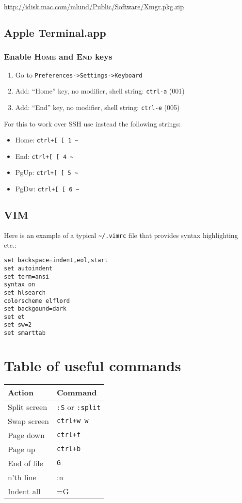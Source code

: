 \documentclass[a4paper,10pt]{article}
\begin{document}
\url{http://idisk.mac.com/mlund/Public/Software/Xmgr.pkg.zip}\\

\subsection{Apple Terminal.app}
\subsubsection{Enable \textsc{Home} and \textsc{End} keys}
\begin{enumerate}
\item Go to \verb"Preferences->Settings->Keyboard"
\item Add: ``Home'' key, no modifier, shell string: \verb"ctrl-a" (001)
\item Add: ``End'' key, no modifier, shell string: \verb"ctrl-e" (005)
\end{enumerate}
For this to work over SSH use instead the following strings:
\begin{itemize}
\item Home: \verb"ctrl+[ [ 1 ~"
\item End: \verb"ctrl+[ [ 4 ~"
\item PgUp: \verb"ctrl+[ [ 5 ~"
\item PgDw: \verb"ctrl+[ [ 6 ~"
\end{itemize}

\subsection{VIM}
Here is an example of a typical \verb"~/.vimrc" file that provides syntax highlighting etc.:
\begin{footnotesize}\begin{verbatim}
set backspace=indent,eol,start
set autoindent
set term=ansi
syntax on
set hlsearch
colorscheme elflord
set backgound=dark
set et
set sw=2
set smarttab
\end{verbatim}\end{footnotesize}

\section{Table of useful commands}
\begin{table}[h]
\center\begin{small}
\begin{tabular}{ll}\hline\hline
Action         & Command \\\hline
Split screen   & \verb":S" or \verb":split"\\
Swap screen    & \verb"ctrl+w w"\\
Page down      & \verb"ctrl+f"\\
Page up        & \verb"ctrl+b"\\
End of file    & \verb"G"\\
n'th line      & :n\\
Indent all     & =G\\
\end{tabular}\end{small}\end{table}
\end{document}
